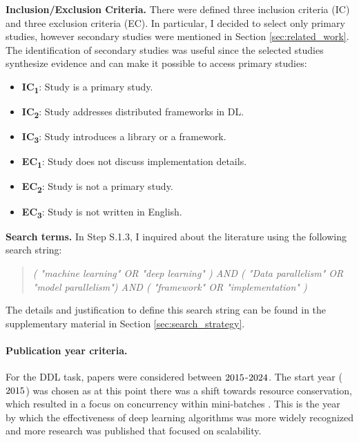 \textbf{Inclusion/Exclusion Criteria.}
There were defined three inclusion criteria (IC) and three exclusion criteria (EC). In particular, I
decided to select only primary studies, however secondary studies were mentioned in Section
\ref{sec:related_work}. The identification of secondary studies was useful since the selected
studies synthesize evidence and can make it possible to access primary studies:

\begin{itemize}
	\item \textbf{IC\textsubscript{1}}: Study is a primary study.
	\item \textbf{IC\textsubscript{2}}: Study addresses distributed frameworks in DL.
	\item \textbf{IC\textsubscript{3}}: Study introduces a library or a framework. \\
	\item \textbf{EC\textsubscript{1}}: Study does not discuss implementation details.
	\item \textbf{EC\textsubscript{2}}: Study is not a primary study.
	\item \textbf{EC\textsubscript{3}}: Study is not written in English.
\end{itemize}

\textbf{Search terms.}
In Step S.1.3, I inquired about the literature using the following search string:
\begin{quote}
	\textit{( "machine learning" OR "deep learning" )
		AND
		( "Data parallelism" OR "model parallelism")
		AND
		( "framework" OR "implementation" )}
\end{quote}

The details and justification to define this search string can be found in the supplementary
material in Section \ref{sec:search_strategy}. 

\paragraph{Publication year criteria.}
For the DDL task, papers were considered between $2015$-$2024$. The start year
($2015$) was chosen as at this point there was a shift towards resource conservation,
which resulted in a focus on concurrency within mini-batches \cite{ben-nun_demystifying_2020}. This
is the year by which the effectiveness of deep learning algorithms was more widely recognized and
more research was published that focused on scalability.

